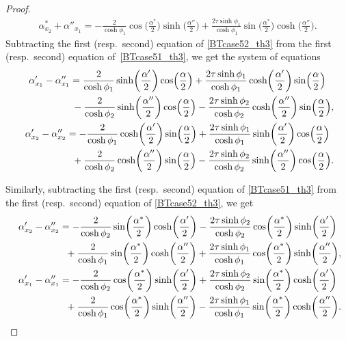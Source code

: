 \documentclass[pdftex]{sigma}
\numberwithin{equation}{section}
\begin{document}
\begin{proof}
\begin{gather}
\alpha^*_{x_2}+\alpha''_{x_1}=-\frac{2}{\cosh\phi_1}\cos\biggl(\frac{\alpha^*}{2}\biggr)\sinh\biggl(\frac{\alpha''}{2}\biggr)+\frac{2\tau\sinh\phi_1}{\cosh\phi_1} \sin\biggl(\frac{\alpha^*}{2}\biggr)\cosh\biggl(\frac{\alpha''}{2}\biggr).\label{BTcase51_th3}
\end{gather}
Subtracting the first (resp.\ second) equation of \eqref{BTcase52_th3} from the first (resp.\ second) equation of~\eqref{BTcase51_th3}, we get the system of equations
\begin{gather}
\alpha'_{x_1}-\alpha''_{x_1}=\frac{2}{\cosh\phi_1}\sinh\biggl(\frac{\alpha'}{2}\biggr)\cos \Bigl(\frac{\alpha}{2}\Bigr)+\frac{2\tau\sinh\phi_1}{\cosh\phi_1} \cosh\biggl(\frac{\alpha'}{2}\biggr)\sin\Bigl(\frac{\alpha}{2}\Bigr)
\nonumber\\ \hphantom{\alpha'_{x_1}-\alpha''_{x_1}=}{}
 - \frac{2}{\cosh\phi_2}\sinh\biggl(\frac{\alpha''}{2}\biggr)\cos \Bigl(\frac{\alpha}{2}\Bigr)-\frac{2\tau\sinh\phi_2}{\cosh\phi_2} \cosh\biggl(\frac{\alpha''}{2}\biggr)\sin\Bigl(\frac{\alpha}{2}\Bigr),\nonumber\\
\alpha'_{x_2}-\alpha''_{x_2}= -\frac{2}{\cosh\phi_1}\cosh\biggl(\frac{\alpha'}{2}\biggr)\sin\Bigl(\frac{\alpha}{2}\Bigr)+\frac{2\tau\sinh\phi_1}{\cosh\phi_1} \sinh\biggl(\frac{\alpha'}{2}\biggr)\cos\Bigl(\frac{\alpha}{2}\Bigr)
\nonumber\\ \hphantom{\alpha'_{x_2}-\alpha''_{x_2}=}{}
+\frac{2}{\cosh\phi_2}\cosh\biggl(\frac{\alpha''}{2}\biggr)\sin\Bigl(\frac{\alpha}{2}\Bigr)-\frac{2\tau\sinh\phi_2}{\cosh\phi_2} \sinh\biggl(\frac{\alpha''}{2}\biggr)\cos\Bigl(\frac{\alpha}{2}\Bigr).\label{BT61minusBT62th3}
\end{gather}

Similarly, subtracting the first (resp.\ second) equation of \eqref{BTcase51_th3} from the first (resp.\ second) equation of \eqref{BTcase52_th3}, we get
\begin{gather} %
\alpha'_{x_2}-\alpha''_{x_2}=-\frac{2}{\cosh\phi_2}\sin\biggl(\frac{\alpha^*}{2}\biggr)\cosh\biggl(\frac{\alpha'}{2}\biggr)-\frac{2\tau\sinh\phi_2}{\cosh\phi_2} \cos\biggl(\frac{\alpha^*}{2}\biggr)\sinh\biggl(\frac{\alpha'}{2}\biggr)
\nonumber\\ \hphantom{\alpha'_{x_2}-\alpha''_{x_2}=}{}
 +\frac{2}{\cosh\phi_1}\sin\biggl(\frac{\alpha^*}{2}\biggr)\cosh\biggl(\frac{\alpha''}{2}\biggr)+\frac{2\tau\sinh\phi_1}{\cosh\phi_1} \cos\biggl(\frac{\alpha^*}{2}\biggr)\sinh\biggl(\frac{\alpha''}{2}\biggr),\nonumber\\
\alpha'_{x_1}-\alpha''_{x_1}=-\frac{2}{\cosh\phi_ 2}\cos\biggl(\frac{\alpha^*}{2}\biggr)\sinh\biggl(\frac{\alpha'}{2}\biggr)+\frac{2\tau\sinh\phi_2}{\cosh\phi_2} \sin\biggl(\frac{\alpha^*}{2}\biggr)\cosh\biggl(\frac{\alpha'}{2}\biggr)
\nonumber\\ \hphantom{\alpha'_{x_1}-\alpha''_{x_1}=}{}
 +\frac{2}{\cosh\phi_1}\cos\biggl(\frac{\alpha^*}{2}\biggr)\sinh\biggl(\frac{\alpha''}{2}\biggr)- \frac{2\tau\sinh\phi_1}{\cosh\phi_1} \sin\biggl(\frac{\alpha^*}{2}\biggr)\cosh\biggl(\frac{\alpha''}{2}\biggr).
\label{BT52minusBT51_th3}
\end{gather}


\end{proof}
\end{document}
